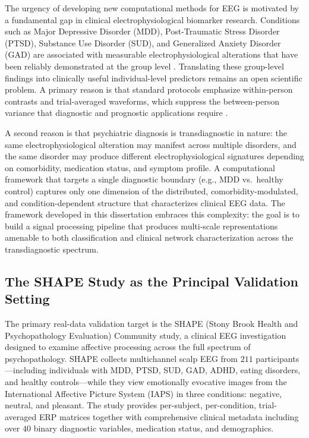 The urgency of developing new computational methods for EEG is motivated by a fundamental gap in clinical electrophysiological biomarker research. Conditions such as Major Depressive Disorder (MDD), Post-Traumatic Stress Disorder (PTSD), Substance Use Disorder (SUD), and Generalized Anxiety Disorder (GAD) are associated with measurable electrophysiological alterations that have been reliably demonstrated at the group level \cite{gehring_erp_2012, nelson_hajcak_2017}. Translating these group-level findings into clinically useful individual-level predictors remains an open scientific problem. A primary reason is that standard protocols emphasize within-person contrasts and trial-averaged waveforms, which suppress the between-person variance that diagnostic and prognostic applications require \cite{weinberg_hajcak_2011}.

A second reason is that psychiatric diagnosis is transdiagnostic in nature: the same electrophysiological alteration may manifest across multiple disorders, and the same disorder may produce different electrophysiological signatures depending on comorbidity, medication status, and symptom profile. A computational framework that targets a single diagnostic boundary (e.g., MDD vs.\ healthy control) captures only one dimension of the distributed, comorbidity-modulated, and condition-dependent structure that characterizes clinical EEG data. The framework developed in this dissertation embraces this complexity: the goal is to build a signal processing pipeline that produces multi-scale representations amenable to both classification and clinical network characterization across the transdiagnostic spectrum.

\subsection{The SHAPE Study as the Principal Validation Setting}

The primary real-data validation target is the SHAPE (Stony Brook Health and Psychopathology Evaluation) Community study, a clinical EEG investigation designed to examine affective processing across the full spectrum of psychopathology. SHAPE collects multichannel scalp EEG from $211$ participants---including individuals with MDD, PTSD, SUD, GAD, ADHD, eating disorders, and healthy controls---while they view emotionally evocative images from the International Affective Picture System (IAPS) \cite{lang_iaps_2008} in three conditions: negative, neutral, and pleasant. The study provides per-subject, per-condition, trial-averaged ERP matrices together with comprehensive clinical metadata including over $40$ binary diagnostic variables, medication status, and demographics.

